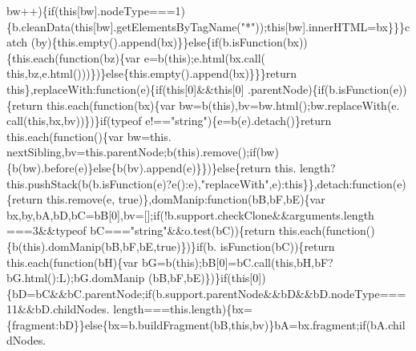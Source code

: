 \begin{DoxyCode}
      bw++)\{\textcolor{keywordflow}{if}(\textcolor{keyword}{this}[bw].nodeType===1)\{b.cleanData(\textcolor{keyword}{this}[bw].getElementsByTagName(\textcolor{stringliteral}{"*"}));\textcolor{keyword}{this}[bw].innerHTML=bx\}\}\}\textcolor{keywordflow}{catch}
      (by)\{this.empty().append(bx)\}\}\textcolor{keywordflow}{else}\{\textcolor{keywordflow}{if}(b.isFunction(bx))\{this.each(\textcolor{keyword}{function}(bz)\{var e=b(\textcolor{keyword}{this});e.html(bx.call(\textcolor{keyword}{
      this},bz,e.html()))\})\}\textcolor{keywordflow}{else}\{this.empty().append(bx)\}\}\}\textcolor{keywordflow}{return} \textcolor{keyword}{this}\},replaceWith:\textcolor{keyword}{function}(e)\{\textcolor{keywordflow}{if}(\textcolor{keyword}{this}[0]&&\textcolor{keyword}{this}[0]
      .parentNode)\{\textcolor{keywordflow}{if}(b.isFunction(e))\{\textcolor{keywordflow}{return} this.each(\textcolor{keyword}{function}(bx)\{var bw=b(\textcolor{keyword}{this}),bv=bw.html();bw.replaceWith(e.
      call(\textcolor{keyword}{this},bx,bv))\})\}\textcolor{keywordflow}{if}(typeof e!==\textcolor{stringliteral}{"string"})\{e=b(e).detach()\}\textcolor{keywordflow}{return} this.each(\textcolor{keyword}{function}()\{var bw=this.
      nextSibling,bv=this.parentNode;b(\textcolor{keyword}{this}).remove();\textcolor{keywordflow}{if}(bw)\{b(bw).before(e)\}\textcolor{keywordflow}{else}\{b(bv).append(e)\}\})\}\textcolor{keywordflow}{else}\{\textcolor{keywordflow}{return} this.
      length?this.pushStack(b(b.isFunction(e)?e():e),\textcolor{stringliteral}{"replaceWith"},e):this\}\},detach:function(e)\{\textcolor{keywordflow}{return} this.\textcolor{keyword}{remove}(e,\textcolor{keyword}{
      true})\},domManip:\textcolor{keyword}{function}(bB,bF,bE)\{var bx,by,bA,bD,bC=bB[0],bv=[];\textcolor{keywordflow}{if}(!b.support.checkClone&&arguments.length
      ===3&&typeof bC===\textcolor{stringliteral}{"string"}&&o.test(bC))\{\textcolor{keywordflow}{return} this.each(\textcolor{keyword}{function}()\{b(\textcolor{keyword}{this}).domManip(bB,bF,bE,\textcolor{keyword}{true})\})\}\textcolor{keywordflow}{if}(b.
      isFunction(bC))\{\textcolor{keywordflow}{return} this.each(\textcolor{keyword}{function}(bH)\{var bG=b(\textcolor{keyword}{this});bB[0]=bC.call(\textcolor{keyword}{this},bH,bF?bG.html():L);bG.domManip
      (bB,bF,bE)\})\}\textcolor{keywordflow}{if}(\textcolor{keyword}{this}[0])\{bD=bC&&bC.parentNode;\textcolor{keywordflow}{if}(b.support.parentNode&&bD&&bD.nodeType===11&&bD.childNodes.
      length===\textcolor{keyword}{this}.length)\{bx=\{fragment:bD\}\}\textcolor{keywordflow}{else}\{bx=b.buildFragment(bB,\textcolor{keyword}{this},bv)\}bA=bx.fragment;\textcolor{keywordflow}{if}(bA.childNodes.

\end{DoxyCode}
